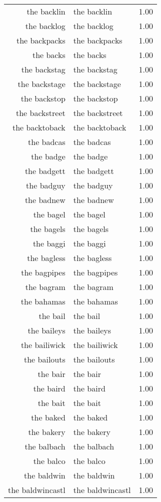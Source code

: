 \begin{table}[ht]
\begin{tabular}{rlr}
  the backlin & the backlin & 1.00 \\ 
  the backlog & the backlog & 1.00 \\ 
  the backpacks & the backpacks & 1.00 \\ 
  the backs & the backs & 1.00 \\ 
  the backstag & the backstag & 1.00 \\ 
  the backstage & the backstage & 1.00 \\ 
  the backstop & the backstop & 1.00 \\ 
  the backstreet & the backstreet & 1.00 \\ 
  the backtoback & the backtoback & 1.00 \\ 
  the badcas & the badcas & 1.00 \\ 
  the badge & the badge & 1.00 \\ 
  the badgett & the badgett & 1.00 \\ 
  the badguy & the badguy & 1.00 \\ 
  the badnew & the badnew & 1.00 \\ 
  the bagel & the bagel & 1.00 \\ 
  the bagels & the bagels & 1.00 \\ 
  the baggi & the baggi & 1.00 \\ 
  the bagless & the bagless & 1.00 \\ 
  the bagpipes & the bagpipes & 1.00 \\ 
  the bagram & the bagram & 1.00 \\ 
  the bahamas & the bahamas & 1.00 \\ 
  the bail & the bail & 1.00 \\ 
  the baileys & the baileys & 1.00 \\ 
  the bailiwick & the bailiwick & 1.00 \\ 
  the bailouts & the bailouts & 1.00 \\ 
  the bair & the bair & 1.00 \\ 
  the baird & the baird & 1.00 \\ 
  the bait & the bait & 1.00 \\ 
  the baked & the baked & 1.00 \\ 
  the bakery & the bakery & 1.00 \\ 
  the balbach & the balbach & 1.00 \\ 
  the balco & the balco & 1.00 \\ 
  the baldwin & the baldwin & 1.00 \\ 
  the baldwincastl & the baldwincastl & 1.00 \\ 

\end{tabular}
\end{table}
